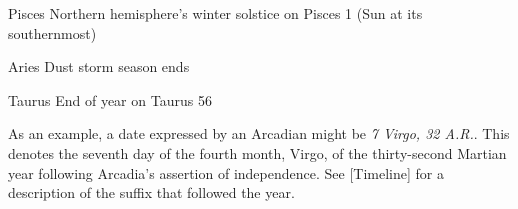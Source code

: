{    \bTR
      \bTC Pisces \eTC
      \bTC \math{[270^{\circ}, 300^{\circ})} \eTC
       \eTC
       \eTC
      \bTC Northern hemisphere's winter solstice on Pisces 1 (Sun at its southernmost) \eTC
    \eTR
    
    \bTR
      \bTC Aries \eTC
      \bTC \math{[300^{\circ}, 330^{\circ})} \eTC
       \eTC
       \eTC
      \bTC Dust storm season ends \eTC
    \eTR 

    \bTR
      \bTC Taurus \eTC
      \bTC \math{[330^{\circ}, 360^{\circ})} \eTC
       \eTC
       \eTC
      \bTC End of year on Taurus 56 \eTC
    \eTR 
\eTABLEbody

\eTABLE
}

As an example, a date expressed by an Arcadian might be {\it 7 Virgo, 32 A.R.}. This denotes the seventh day of the fourth month, Virgo, of the thirty-second Martian year following Arcadia's assertion of independence. See [Timeline] for a description of the suffix that followed the year.

